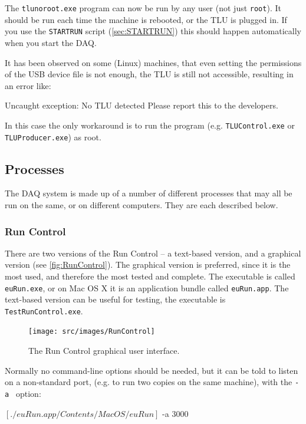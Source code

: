 The \texttt{tlunoroot.exe} program can now be run by any user (not just \texttt{root}).
It should be run each time the machine is rebooted, or the \gls{TLU} is plugged in.
If you use the \texttt{STARTRUN} script (\autoref{sec:STARTRUN})
this should happen automatically when you start the DAQ.

It has been observed on some (Linux) machines,
that even setting the permissions of the USB device file is not enough,
the \gls{TLU} is still not accessible, resulting in an error like:
\begin{listing}[]
Uncaught exception:
No TLU detected
Please report this to the developers.
\end{listing}
In this case the only workaround is to run the program
(e.g. \texttt{TLUControl.exe} or \texttt{TLUProducer.exe}) as root.

\subsection{Processes}
The DAQ system is made up of a number of different processes that may all be run on the same,
or on different computers. They are each described below.

\subsubsection{Run Control}
There are two versions of the Run Control -- a text-based version, and a graphical version (see \autoref{fig:RunControl}).
The graphical version is preferred, since it is the most used, and therefore the most tested and complete.
The executable is called \texttt{euRun.exe}, or on Mac OS X it is an application bundle called \texttt{euRun.app}.
The text-based version can be useful for testing, the executable is \texttt{TestRunControl.exe}.

\begin{figure}[htb]
  \begin{center}
    \texttt{[image: src/images/RunControl]}
    \caption{The Run Control graphical user interface.}
    \label{fig:RunControl}
  \end{center}
\end{figure}

Normally no command-line options should be needed, but it can be told to listen on a non-standard port,
(e.g. to run two copies on the same machine), with the \texttt{-a } option:
\begin{listing}[mybash]
$[./euRun.app/Contents/MacOS/euRun]$ -a 3000
\end{listing}

